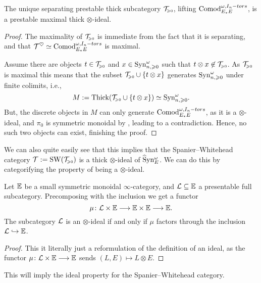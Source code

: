 \begin{lemma}
    The unique separating prestable thick subcategory $\mathcal{T}_{\hspace{-1pt}\scriptscriptstyle\geqslant 0}$, lifting $\mathrm{Comod}_{E_*E}^{\omega, I_n-tors}$, is a prestable maximal thick $\otimes$-ideal. 
\end{lemma}
\begin{proof}
    The maximality of $\mathcal{T}_{\hspace{-1pt}\scriptscriptstyle\geqslant 0}$ is immediate from the fact that it is separating, and that $\mathcal{T}^\heartsuit \simeq \mathrm{Comod}_{E_*E}^{\omega, I_n-tors}$ is maximal. 

    Assume there are objects $t\in \mathcal{T}_{\hspace{-1pt}\scriptscriptstyle\geqslant 0}$ and $x \in \mathrm{Syn}_{n, \geqslant 0}^\omega$ such that $t \otimes x \not\in \mathcal{T}_{\hspace{-1pt}\scriptscriptstyle\geqslant 0}$. As $\mathcal{T}_{\hspace{-1pt}\scriptscriptstyle\geqslant 0}$ is maximal this means that the subset $\mathcal{T}_{\hspace{-1pt}\scriptscriptstyle\geqslant 0} \cup \{t \otimes x\}$ generates $\mathrm{Syn}_{n, \geqslant 0}^\omega$ under finite colimits, i.e., 
    \[M:= \mathrm{Thick}(\mathcal{T}_{\hspace{-1pt}\scriptscriptstyle\geqslant 0} \cup \{t \otimes x\}) \simeq \mathrm{Syn}_{n, \geqslant 0}^\omega.\]
    But, the discrete objects in $M$ can only generate $\mathrm{Comod}_{E_*E}^{\omega, I_n-tors}$, as it is a $\otimes$-ideal, and $\pi_0$ is symmetric monoidal by \cite[A.12]{antieau_nikolaus_2020}, leading to a contradiction. Hence, no such two objects can exist, finishing the proof. 
\end{proof}

We can also quite easily see that this implies that the Spanier--Whitehead category $\mathcal{T} := \operatorname{SW}(\mathcal{T}_{\hspace{-1pt}\scriptscriptstyle\geqslant 0})$ is a thick $\otimes$-ideal of $\widehat{\mathrm{S}}\mathrm{yn}_{E}^\omega$. We can do this by categorifying the property of being a $\otimes$-ideal. 

\begin{lemma}
    \label{ch3:add:lm:categorical-ideal-property}
    Let $\mathbb{E}$ be a small symmetric monoidal $\infty$-category, and $\mathcal{L}\subseteq \mathbb{E}$ a presentable full subcategory. Precomposing with the inclusion we get a functor 
    \[\mu\colon \mathcal{L}\times \mathbb{E} \longrightarrow \mathbb{E}\times\mathbb{E} \longrightarrow \mathbb{E}.\]
    The subcategory $\mathcal{L}$ is an $\otimes$-ideal if and only if $\mu$ factors through the inclusion $\mathcal{L}\hookrightarrow \mathbb{E}$. 
\end{lemma}
\begin{proof}
    This it literally just a reformulation of the definition of an ideal, as the functor $\mu\colon \mathcal{L}\times \mathbb{E} \longrightarrow \mathbb{E}$ sends $(L,E) \mapsto L\otimes E$. 
\end{proof}

This will imply the ideal property for the Spanier--Whitehead category. 

